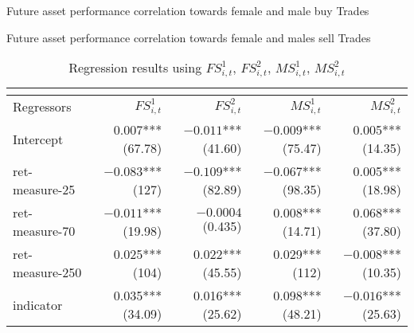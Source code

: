 \documentclass{beamer}
\begin{document}
\begin{frame}{Future asset performance correlation towards female and male buy Trades}
\begin{frame}{Future asset performance correlation towards female and males sell Trades}

\begin{table}[htbp]
    \centering
    \caption{Regression results using $FS^1_{i,t}$, $FS^2_{i,t}$, $MS^1_{i,t}$, $MS^2_{i,t}$}
    \label{tab:FS-MS}
    \tiny
\begin{tabular}{ lrrrr } 
 \multicolumn{1}{c}{} \\
 \toprule
 Regressors & $FS^1_{i,t}$ & $FS^2_{i,t}$ & $MS^1_{i,t}$ & $MS^2_{i,t}$  \\ 
  \midrule
Intercept  & \shortstack{0.007*** \\ (67.78)}& \shortstack{$-0.011$*** \\ (41.60)} & \shortstack{$-0.009$*** \\ (75.47)} &  \shortstack{0.005*** \\ (14.35)}\\

ret-measure-25  & \shortstack{$-0.083$*** \\ (127)}&  \shortstack{$-0.109$*** \\ (82.89)} & \shortstack{$-0.067$*** \\ (98.35)} &  \shortstack{0.005*** \\ (18.98)}\\

ret-measure-70  & \shortstack{ $-0.011$*** \\ (19.98)} & \shortstack{ $-0.0004$ \\  (0.435)}& \shortstack{ 0.008***  \\ (14.71)}& \shortstack{0.068*** \\ (37.80)} \\

ret-measure-250 & \shortstack{0.025*** \\ (104)}& \shortstack{0.022*** \\ (45.55)} & \shortstack{0.029*** \\ (112)} & \shortstack{$-0.008$*** \\ (10.35)}\\

indicator & \shortstack{0.035*** \\ (34.09)}& \shortstack{0.016*** \\ (25.62)} &\shortstack{0.098*** \\ (48.21)} &  \shortstack{$-0.016$*** \\ (25.63)}\\


\end{tabular}
\end{table}
\end{frame}
\end{frame}
\end{document}
